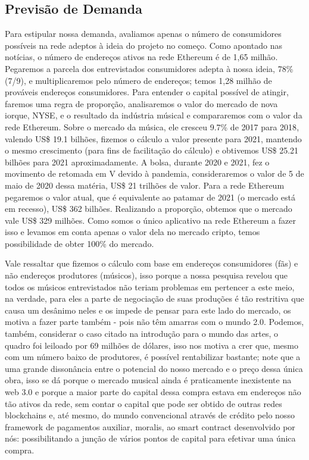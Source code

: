 \documentclass[onecolumn,12pt]{asme2ej}
\begin{document}
\subsection{Previsão de Demanda} 

Para estipular nossa demanda, avaliamos apenas o número de consumidores possíveis na rede adeptos à ideia do projeto no começo. Como apontado nas notícias, o número de endereços ativos na rede Ethereum é de 1,65 milhão\cite{finb}. Pegaremos a parcela dos entrevistados consumidores adepta à nossa ideia, 78\% (7/9), e multiplicaremos pelo número de endereços; temos 1,28 milhão de prováveis endereços consumidores. Para entender o capital possível de atingir, faremos uma regra de proporção, analisaremos o valor do mercado de nova iorque, NYSE, e o resultado da indústria músical e compararemos com o valor da rede Ethereum. Sobre o mercado da música, ele cresceu 9.7\% de 2017 para 2018\cite{ubcm}, valendo US\$ 19.1 bilhões, fizemos o cálculo a valor presente para 2021, mantendo o mesmo crescimento (para fins de facilitação do cálculo) e obtivemos US\$ 25.21 bilhões para 2021 aproximadamente. A bolsa, durante 2020 e 2021, fez o movimento de retomada em V devido à pandemia, consideraremos o valor de 5 de maio de 2020 dessa matéria\cite{nyse}, US\$ 21 trilhões de valor. Para a rede Ethereum pegaremos o valor atual, que é equivalente ao patamar de 2021 (o mercado está em recesso), US\$ 362 bilhões\cite{coim}. Realizando a proporção, obtemos que o mercado vale US\$ 329 milhões. Como somos o único aplicativo na rede Ethereum a fazer isso e levamos em conta apenas o valor dela no mercado cripto, temos possibilidade de obter 100\% do mercado. 

Vale ressaltar que fizemos o cálculo com base em endereços consumidores (fãs) e não endereços produtores (músicos), isso porque a nossa pesquisa revelou que todos os músicos entrevistados não teriam problemas em pertencer a este meio, na verdade, para eles a parte de negociação de suas produções é tão restritiva que causa um desânimo neles e os impede de pensar para este lado do mercado, os motiva a fazer parte também - pois não têm amarras com o mundo 2.0. Podemos, também, considerar o caso citado na introdução para o mundo das artes, o quadro foi leiloado por 69 milhões de dólares, isso nos motiva a crer que, mesmo com um número baixo de produtores, é possível rentabilizar bastante; note que a uma grande dissonância entre o potencial do nosso mercado e o preço dessa única obra, isso se dá porque o mercado musical ainda é praticamente inexistente na web 3.0 e porque a maior parte do capital dessa compra estava em endereços não tão ativos da rede, sem contar o capital que pode ser obtido de outras redes blockchains e, até mesmo, do mundo convencional através de crédito pelo nosso framework de pagamentos auxiliar, moralis, ao smart contract desenvolvido por nós: possibilitando a junção de vários pontos de capital para efetivar uma única compra.
\end{document}
